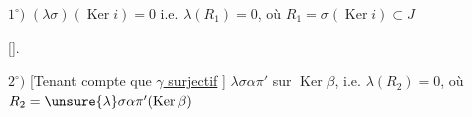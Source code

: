 $1^\circ)$ $(\lambda\sigma)(\operatorname{Ker}i)=0$ i.e. $\lambda(R_1)=0$, où $R_1=\sigma(\operatorname{Ker}i)\subset J$


[].

$2^\circ)$ [Tenant compte que \uline{$\gamma$ surjectif} ] $\lambda\sigma\alpha\pi'$  sur $\operatorname{Ker}\beta$, i.e. $\lambda(R_2)=0$, où $R_2=\unsure{\lambda}\sigma\alpha\pi'(\operatorname{Ker}\beta)$

